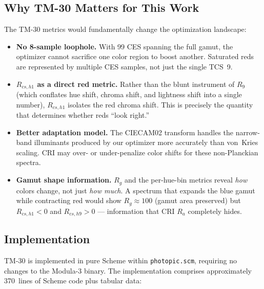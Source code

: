 \documentclass[11pt]{article}
\begin{document}
\subsection{Why TM-30 Matters for This Work}

The TM-30 metrics would fundamentally change the optimization landscape:

\begin{itemize}
\item \textbf{No 8-sample loophole.}  With 99 CES spanning the full
  gamut, the optimizer cannot sacrifice one color region to boost
  another.  Saturated reds are represented by multiple CES samples,
  not just the single TCS~9.

\item \textbf{$R_{cs,h1}$ as a direct red metric.}  Rather than the
  blunt instrument of $R_9$ (which conflates hue shift, chroma shift,
  and lightness shift into a single number), $R_{cs,h1}$ isolates the
  red chroma shift.  This is precisely the quantity that determines
  whether reds ``look right.''

\item \textbf{Better adaptation model.}  The CIECAM02 transform handles
  the narrow-band illuminants produced by our optimizer more accurately
  than von~Kries scaling.  CRI may over- or under-penalize color shifts
  for these non-Planckian spectra.

\item \textbf{Gamut shape information.}  $R_g$ and the per-hue-bin
  metrics reveal \emph{how} colors change, not just \emph{how much}.
  A spectrum that expands the blue gamut while contracting red would
  show $R_g \approx 100$ (gamut area preserved) but $R_{cs,h1} < 0$
  and $R_{cs,h9} > 0$ --- information that CRI $R_a$ completely hides.
\end{itemize}

\subsection{Implementation}

TM-30 is implemented in pure Scheme within \texttt{photopic.scm},
requiring no changes to the Modula-3 binary.  The implementation
comprises approximately 370~lines of Scheme code plus tabular data:
\end{document}
